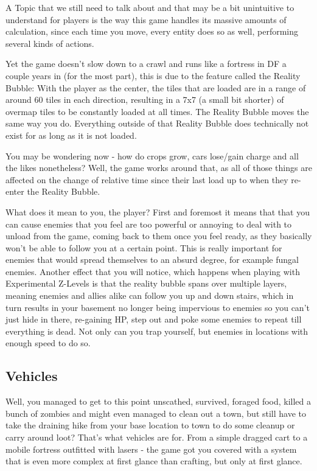 A Topic that we still need to talk about and that may be a bit unintuitive to understand for players is the way this game handles its massive amounts of calculation, since each time you move, every entity does so as well, performing several kinds of actions.

Yet the game doesn't slow down to a crawl and runs like a fortress in DF a couple years in (for the most part), this is due to the feature called the Reality Bubble: With the player as the center, the tiles that are loaded are in a range of around 60 tiles in each direction, resulting in a 7x7 (a small bit shorter) of overmap tiles to be constantly loaded at all times. The Reality Bubble moves the same way you do. Everything outside of that Reality Bubble does technically not exist for as long as it is not loaded.

You may be wondering now - how do crops grow, cars lose/gain charge and all the likes nonetheless? Well, the game works around that, as all of those things are affected on the change of relative time since their last load up to when they re-enter the Reality Bubble.

What does it mean to you, the player? First and foremost it means that that you can cause enemies that you feel are too powerful or annoying to deal with to unload from the game, coming back to them once you feel ready, as they basically won't be able to follow you at a certain point. This is really important for enemies that would spread themselves to an absurd degree, for example fungal enemies. Another effect that you will notice, which happens when playing with Experimental Z-Levels is that the reality bubble spans over multiple layers, meaning enemies and allies alike can follow you up and down stairs, which in turn results in your basement no longer being impervious to enemies so you can't just hide in there, re-gaining HP, step out and poke some enemies to repeat till everything is dead. Not only can you trap yourself, but enemies in locations with enough speed to do so.

\subsection{Vehicles}

Well, you managed to get to this point unscathed, survived, foraged food, killed a bunch of zombies and might even managed to clean out a town, but still have to take the draining hike from your base location to town to do some cleanup or carry around loot? That's what vehicles are for. From a simple dragged cart to a mobile fortress outfitted with lasers - the game got you covered with a system that is even more complex at first glance than crafting, but only at first glance.

